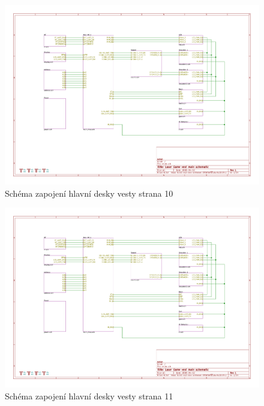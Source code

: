 \begin{landscape}
    \begin{figure}[h]
        \centering
        \includegraphics[page=10, height=\textwidth]{sch/main}
        \caption{Schéma zapojení hlavní desky vesty strana 10}
    \end{figure}
\end{landscape}
\begin{landscape}
    \begin{figure}[h]
        \centering
        \includegraphics[page=11, height=\textwidth]{sch/main}
        \caption{Schéma zapojení hlavní desky vesty strana 11}
    \end{figure}
\end{landscape}

